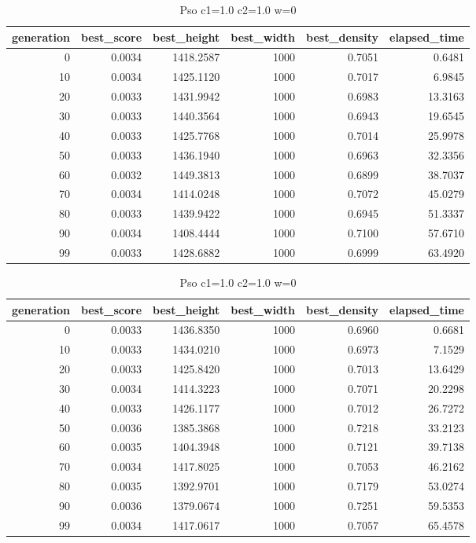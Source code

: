 \begin{table}[htbp]
    \centering
    \caption{Pso c1=1.0 c2=1.0 w=0}
    \label{tab:pso_c1_1_0_c2_1_0_w_0}
    \begin{tabular}{rrrrrr}
    \toprule
    generation & best_score & best_height & best_width & best_density & elapsed_time \\
    \midrule
    0 & 0.0034 & 1418.2587 & 1000 & 0.7051 & 0.6481 \\
    10 & 0.0034 & 1425.1120 & 1000 & 0.7017 & 6.9845 \\
    20 & 0.0033 & 1431.9942 & 1000 & 0.6983 & 13.3163 \\
    30 & 0.0033 & 1440.3564 & 1000 & 0.6943 & 19.6545 \\
    40 & 0.0033 & 1425.7768 & 1000 & 0.7014 & 25.9978 \\
    50 & 0.0033 & 1436.1940 & 1000 & 0.6963 & 32.3356 \\
    60 & 0.0032 & 1449.3813 & 1000 & 0.6899 & 38.7037 \\
    70 & 0.0034 & 1414.0248 & 1000 & 0.7072 & 45.0279 \\
    80 & 0.0033 & 1439.9422 & 1000 & 0.6945 & 51.3337 \\
    90 & 0.0034 & 1408.4444 & 1000 & 0.7100 & 57.6710 \\
    99 & 0.0033 & 1428.6882 & 1000 & 0.6999 & 63.4920 \\
    \bottomrule
    \end{tabular}
\end{table}


\begin{table}[htbp]
    \centering
    \caption{Pso c1=1.0 c2=1.0 w=0}
    \label{tab:pso_c1_1_0_c2_1_0_w_0}
    \begin{tabular}{rrrrrr}
    \toprule
    generation & best_score & best_height & best_width & best_density & elapsed_time \\
    \midrule
    0 & 0.0033 & 1436.8350 & 1000 & 0.6960 & 0.6681 \\
    10 & 0.0033 & 1434.0210 & 1000 & 0.6973 & 7.1529 \\
    20 & 0.0033 & 1425.8420 & 1000 & 0.7013 & 13.6429 \\
    30 & 0.0034 & 1414.3223 & 1000 & 0.7071 & 20.2298 \\
    40 & 0.0033 & 1426.1177 & 1000 & 0.7012 & 26.7272 \\
    50 & 0.0036 & 1385.3868 & 1000 & 0.7218 & 33.2123 \\
    60 & 0.0035 & 1404.3948 & 1000 & 0.7121 & 39.7138 \\
    70 & 0.0034 & 1417.8025 & 1000 & 0.7053 & 46.2162 \\
    80 & 0.0035 & 1392.9701 & 1000 & 0.7179 & 53.0274 \\
    90 & 0.0036 & 1379.0674 & 1000 & 0.7251 & 59.5353 \\
    99 & 0.0034 & 1417.0617 & 1000 & 0.7057 & 65.4578 \\
    \bottomrule
    \end{tabular}
\end{table}


